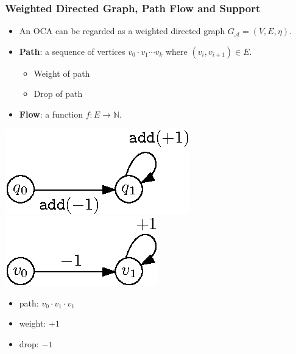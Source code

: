 \documentclass[11pt]{beamer}
\begin{document}
\begin{frame}\frametitle{Weighted Directed Graph,  Path Flow and Support}
\begin{itemize}

\item An OCA can be regarded as a weighted directed graph $G_\mathcal{A} = (V,E,\eta)$.

\item \textbf{Path}: a sequence of vertices $v_0\cdot v_1 \cdots v_k$ where $(v_i, v_{i+1}) \in E$.
\begin{itemize}
\item Weight of path
\item Drop of path
\end{itemize}
\item \textbf{Flow}: a function $f: E\rightarrow \mathbb{N}$.
\end{itemize}

\begin{example}
\begin{center}
\includegraphics[scale=1]{reachexample2.eps}
\includegraphics[scale=1]{wg.eps}
\begin{itemize}

\item path: $v_0\cdot v_1\cdot v_1$
\item weight: $+1$
\item drop: $-1$
\end{itemize}
\end{center}


\end{example}
\end{frame}
\end{document}
